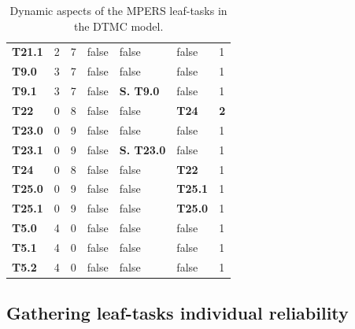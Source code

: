 \begin{table}[ht!]
{\begin{tabularx}{\textwidth}{@{}lllllll@{}}
\textbf{T21.1}   & 2                & 7                  & false             & false                & false                & 1           \\
\textbf{T9.0}  & 3                  & 7                  & false             & false	        		& false                 & 1           \\
\textbf{T9.1}  & 3                  & 7                  & false             & \textbf{S. T9.0}     & false                 & 1           \\
\textbf{T22}   & 0                  & 8                  & false             & false                & \textbf{T24}                  & \textbf{2}  \\
\textbf{T23.0} & 0                  & 9                  & false             & false                & false                  & 1           \\
\textbf{T23.1} & 0                  & 9                  & false             & \textbf{S. T23.0}   & false                  & 1           \\
\textbf{T24}   & 0                  & 8                  & false             & false                & \textbf{T22}                  & 1           \\
\textbf{T25.0} & 0                  & 9                  & false             & false                & \textbf{T25.1                 } & 1           \\
\textbf{T25.1} & 0                  & 9                  & false             & false                & \textbf{T25.0}                  & 1           \\
\textbf{T5.0} & 4                   & 0                  & false             & false                & false                & 1           \\
\textbf{T5.1} & 4                   & 0                  & false             & false                & false                & 1           \\
\textbf{T5.2} & 4                   & 0                  & false             & false                & false                & 1           \\ \bottomrule
\end{tabularx}
\caption{Dynamic aspects of the MPERS leaf-tasks in the DTMC model.}
\label{tab:MPERS_DTMC_SLOTS}
}
\end{table}


\subsection{Gathering leaf-tasks individual reliability}

